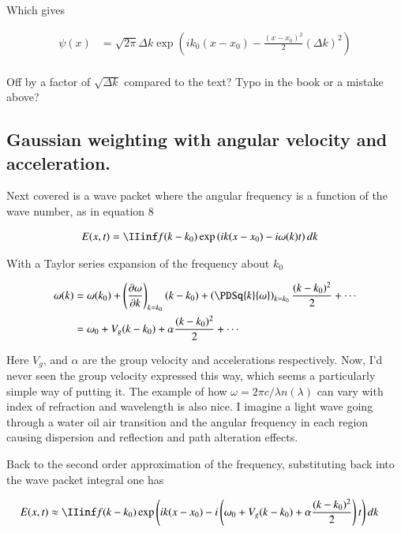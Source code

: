 Which gives 

\begin{align*}
\psi(x) 
&= \sqrt{2 \pi} \Delta k 
\exp\left( i k_0 (x-x_0) - \frac{(x-x_0)^2}{2} (\Delta k)^2 \right) \\
\end{align*}

Off by a factor of $\sqrt{\Delta k}$ compared to the text?  Typo in the book or a mistake above?

\subsection{Gaussian weighting with angular velocity and acceleration. }

Next covered is a wave packet where the angular frequency is a function of the wave number, as in equation 8

\begin{align*}
E(x,t) &= \IIinf f(k - k_0) \exp\left( i k(x-x_0) - i\omega(k) t\right) dk
\end{align*}

With a Taylor series expansion of the frequency about $k_0$

\begin{align*}
\omega(k) 
&= \omega(k_0) + \left(\PD{k}{\omega}\right)_{k=k_0} (k-k_0) + \left(\PDSq{k}{\omega}\right)_{k=k_0} \frac{(k-k_0)^2}{2} + \cdots \\
&= \omega_0 + V_g (k-k_0) + \alpha \frac{(k-k_0)^2}{2} + \cdots \\
\end{align*}

Here $V_g$, and $\alpha$ are the group velocity and accelerations respectively.  Now, I'd never seen the group velocity expressed
this way, which seems a particularly simple way of putting it.
The example of how $\omega = 2 \pi c/\lambda n(\lambda)$ can vary with index of refraction and wavelength is also nice.  I
imagine a light wave going through a water oil air transition and the angular frequency in each region causing dispersion and 
reflection and path alteration effects.

Back to the second order approximation of the frequency, substituting back into the wave packet integral one has

\begin{align*}
E(x,t) &\approx \IIinf f(k - k_0) \exp\left( i k(x-x_0) - i
\left(\omega_0 + V_g (k-k_0) + \alpha \frac{(k-k_0)^2}{2} \right)
t\right) dk
\end{align*}

